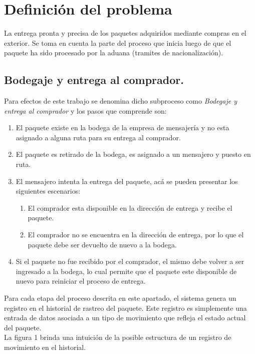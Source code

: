 \documentclass[12pt,a4paper]{article}
\begin{document}
\section{Definición del problema}
La entrega pronta y precisa de los paquetes adquiridos mediante compras en el exterior. Se toma en cuenta la parte del proceso que inicia luego de que el paquete ha sido procesado por la aduana (tramites de nacionalización).
\subsection{Bodegaje y entrega al comprador.}
Para efectos de este trabajo se denomina dicho subproceso como \textit{Bodegaje y entrega al comprador} y los pasos que comprende son:
\begin{enumerate}
\item El paquete existe en la bodega de la empresa de mensajería y no esta asignado a alguna ruta para su entrega al comprador.
\item El paquete es retirado de la bodega, es asignado a un mensajero y puesto en ruta.
\item El mensajero intenta la entrega del paquete, acá se pueden presentar los siguientes escenarios:
\begin{enumerate}
\item El comprador esta disponible en la dirección de entrega y recibe el paquete.
\item El comprador no se encuentra en la dirección de entrega, por lo que el paquete debe ser devuelto de nuevo a la bodega.
\end{enumerate}
\item Si el paquete no fue recibido por el comprador, el mismo debe volver a ser ingresado a la bodega, lo cual permite que el paquete este disponible de nuevo para reiniciar el proceso de entrega.
\end{enumerate}

Para cada etapa del proceso descrita en este apartado, el sistema genera un registro en el historial de rastreo del paquete. Este registro es simplemente una entrada de datos asociada a un tipo de movimiento que refleja el estado actual del paquete.\\[\baselineskip]
\indent La figura 1 brinda una intuición de la posible estructura de un registro de movimiento en el historial. 

\end{document}
